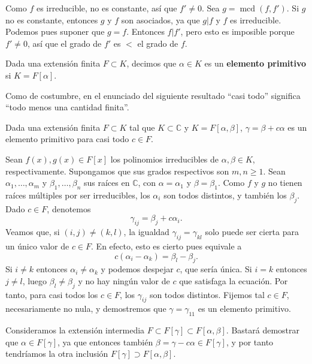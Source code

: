 
Como \(f\) es irreducible, no es constante, así que \(f'\neq 0\). Sea
\(g=\operatorname{mcd}(f,f')\). Si \(g\) no es constante, entonces \(g\)
y \(f\) son asociados, ya que \(g|f\) y \(f\) es irreducible. Podemos
pues suponer que \(g=f\). Entonces \(f|f'\), pero esto es imposible
porque \(f'\neq 0\), así que el grado de \(f'\) es \(<\) el grado de
\(f\). 


Dada una extensión finita \(F\subset K\), decimos que \(\alpha\in K\) es
un \textbf{elemento primitivo} si \(K=F[\alpha]\). 

Como de costumbre, en el enunciado del siguiente resultado ``casi todo''
significa ``todo menos una cantidad finita''.


Dada una extensión finita \(F\subset K\) tal que \(K\subset\mathbb{C}\)
y \(K=F[\alpha,\beta]\), \(\gamma=\beta+c\alpha\) es un elemento
primitivo para casi todo \(c\in F\). 


Sean \(f(x),g(x)\in F[x]\) los polinomios irreducibles de
\(\alpha,\beta\in K\), respectivamente. Supongamos que sus grados
respectivos son \(m,n\geq 1\). Sean \(\alpha_1,\dots,\alpha_m\) y
\(\beta_1,\dots,\beta_n\) sus raíces en \(\mathbb{C}\), con
\(\alpha=\alpha_1\) y \(\beta=\beta_1\). Como \(f\) y \(g\) no tienen
raíces múltiples por ser irreducibles, los \(\alpha_i\) son todos
distintos, y también los \(\beta_j\). Dado \(c\in F\), denotemos
\[\gamma_{ij}=\beta_j+c\alpha_i.\] Veamos que, si
\((i,j)\neq (k,l)\), la igualdad \(\gamma_{ij}=\gamma_{kl}\) solo
puede ser cierta para un único valor de \(c\in F\). En efecto, esto es
cierto pues equivale a \[c(\alpha_i-\alpha_k)=\beta_l-\beta_j.\] Si
\(i\neq k\) entonces \(\alpha_i\neq \alpha_k\) y podemos despejar
\(c\), que sería única. Si \(i=k\) entonces \(j\neq l\), luego
\(\beta_l\neq \beta_j\) y no hay ningún valor de \(c\) que satisfaga
la ecuación. Por tanto, para casi todos los \(c\in F\), los
\(\gamma_{ij}\) son todos distintos. Fijemos tal \(c\in F\),
necesariamente no nula, y demostremos que \(\gamma=\gamma_{11}\) es un
elemento primitivo.

Consideramos la extensión intermedia
\(F\subset F[\gamma]\subset F[\alpha,\beta]\). Bastará demostrar que
\(\alpha\in F[\gamma]\), ya que entonces también
\(\beta=\gamma-c\alpha\in F[\gamma]\), y por tanto tendríamos la otra
inclusión \(F[\gamma]\supset F[\alpha,\beta]\).

